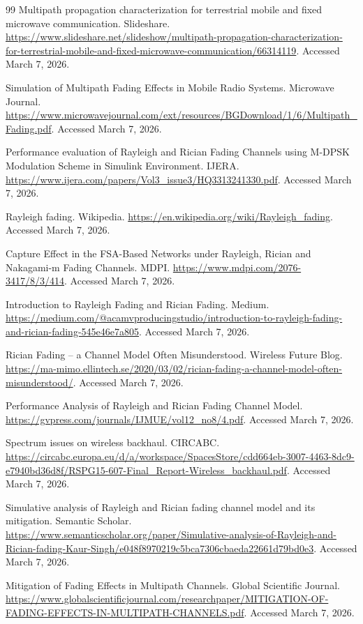 \documentclass[11pt,a4paper]{article}
\begin{document}
\begin{thebibliography}{99}
 Multipath propagation characterization for terrestrial mobile and fixed microwave communication. Slideshare. \url{https://www.slideshare.net/slideshow/multipath-propagation-characterization-for-terrestrial-mobile-and-fixed-microwave-communication/66314119}. Accessed March 7, 2026.

 Simulation of Multipath Fading Effects in Mobile Radio Systems. Microwave Journal. \url{https://www.microwavejournal.com/ext/resources/BGDownload/1/6/Multipath_Fading.pdf}. Accessed March 7, 2026.

 Performance evaluation of Rayleigh and Rician Fading Channels using M-DPSK Modulation Scheme in Simulink Environment. IJERA. \url{https://www.ijera.com/papers/Vol3_issue3/HQ3313241330.pdf}. Accessed March 7, 2026.

 Rayleigh fading. Wikipedia. \url{https://en.wikipedia.org/wiki/Rayleigh_fading}. Accessed March 7, 2026.

 Capture Effect in the FSA-Based Networks under Rayleigh, Rician and Nakagami-m Fading Channels. MDPI. \url{https://www.mdpi.com/2076-3417/8/3/414}. Accessed March 7, 2026.

 Introduction to Rayleigh Fading and Rician Fading. Medium. \url{https://medium.com/@acamvproducingstudio/introduction-to-rayleigh-fading-and-rician-fading-545e46e7a805}. Accessed March 7, 2026.

 Rician Fading -- a Channel Model Often Misunderstood. Wireless Future Blog. \url{https://ma-mimo.ellintech.se/2020/03/02/rician-fading-a-channel-model-often-misunderstood/}. Accessed March 7, 2026.

 Performance Analysis of Rayleigh and Rician Fading Channel Model. \url{https://gvpress.com/journals/IJMUE/vol12_no8/4.pdf}. Accessed March 7, 2026.

 Spectrum issues on wireless backhaul. CIRCABC. \url{https://circabc.europa.eu/d/a/workspace/SpacesStore/cdd664eb-3007-4463-8dc9-e7940bd36d8f/RSPG15-607-Final_Report-Wireless_backhaul.pdf}. Accessed March 7, 2026.

 Simulative analysis of Rayleigh and Rician fading channel model and its mitigation. Semantic Scholar. \url{https://www.semanticscholar.org/paper/Simulative-analysis-of-Rayleigh-and-Rician-fading-Kaur-Singh/e048f8970219c5bca7306cbaeda22661d79bd0e3}. Accessed March 7, 2026.

 Mitigation of Fading Effects in Multipath Channels. Global Scientific Journal. \url{https://www.globalscientificjournal.com/researchpaper/MITIGATION-OF-FADING-EFFECTS-IN-MULTIPATH-CHANNELS.pdf}. Accessed March 7, 2026.


\end{thebibliography}
\end{document}

